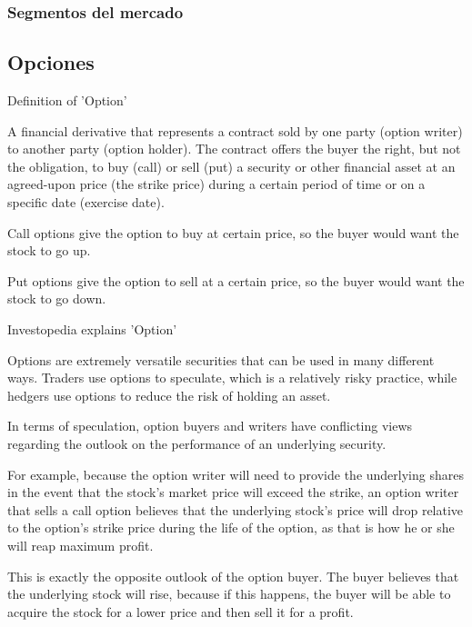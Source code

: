             \subsubsection{ Segmentos del mercado }
            
            
        
        \subsection{ Opciones }
        
        Definition of 'Option'

        A financial derivative that represents a contract sold by one party (option writer) to another party (option holder). The contract offers the buyer the right, but not the obligation, to buy (call) or sell (put) a security or other financial asset at an agreed-upon price (the strike price) during a certain period of time or on a specific date (exercise date).

        Call options give the option to buy at certain price, so the buyer would want the stock to go up.

        Put options give the option to sell at a certain price, so the buyer would want the stock to go down.
        
        Investopedia explains 'Option'

        Options are extremely versatile securities that can be used in many different ways. Traders use options to speculate, which is a relatively risky practice, while hedgers use options to reduce the risk of holding an asset.

        In terms of speculation, option buyers and writers have conflicting views regarding the outlook on the performance of an underlying security.

        For example, because the option writer will need to provide the underlying shares in the event that the stock's market price will exceed the strike, an option writer that sells a call option believes that the underlying stock's price will drop relative to the option's strike price during the life of the option, as that is how he or she will reap maximum profit.

        This is exactly the opposite outlook of the option buyer. The buyer believes that the underlying stock will rise, because if this happens, the buyer will be able to acquire the stock for a lower price and then sell it for a profit.
        

